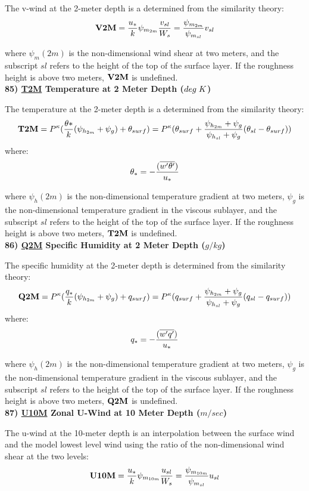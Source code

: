 \noindent
The v-wind at the 2-meter depth is a determined from the similarity theory:
\[
{\bf V2M} = {u_* \over k} \psi_{m_{2m}} {v_{sl} \over {W_s}} =
{ \psi_{m_{2m}} \over {\psi_{m_{sl}} }}v_{sl}
\]

\noindent
where $\psi_m(2m)$ is the non-dimensional wind shear at two meters, and the subscript
$sl$ refers to the height of the top of the surface layer. If the roughness height
is above two meters, ${\bf V2M}$ is undefined.
\\
 
\noindent
{\bf 85)  \underline {T2M}  Temperature at 2 Meter Depth ($deg \hspace{.1cm} K$) }

\noindent
The temperature at the 2-meter depth is a determined from the similarity theory:
\[
{\bf T2M} = P^{\kappa} ({\theta* \over k} ({\psi_{h_{2m}}+\psi_g}) + \theta_{surf} ) = 
P^{\kappa}(\theta_{surf} + { {\psi_{h_{2m}}+\psi_g} \over {{\psi_{h_{sl}}+\psi_g}} }
(\theta_{sl} - \theta_{surf})) 
\]
where:
\[
\theta_* = - { (\overline{w^{\prime}\theta^{\prime}}) \over {u_*} }
\]

\noindent
where $\psi_h(2m)$ is the non-dimensional temperature gradient at two meters, $\psi_g$ is
the non-dimensional temperature gradient in the viscous sublayer, and the subscript
$sl$ refers to the height of the top of the surface layer. If the roughness height
is above two meters, ${\bf T2M}$ is undefined.
\\
 
\noindent
{\bf 86)  \underline {Q2M}  Specific Humidity at 2 Meter Depth ($g/kg$) }

\noindent
The specific humidity at the 2-meter depth is determined from the similarity theory:
\[
{\bf Q2M} = P^{\kappa} ({q_* \over k} ({\psi_{h_{2m}}+\psi_g}) + q_{surf} ) = 
P^{\kappa}(q_{surf} + { {\psi_{h_{2m}}+\psi_g} \over {{\psi_{h_{sl}}+\psi_g}} }
(q_{sl} - q_{surf})) 
\]
where:
\[
q_* = - { (\overline{w^{\prime}q^{\prime}}) \over {u_*} }
\]

\noindent
where $\psi_h(2m)$ is the non-dimensional temperature gradient at two meters, $\psi_g$ is
the non-dimensional temperature gradient in the viscous sublayer, and the subscript
$sl$ refers to the height of the top of the surface layer. If the roughness height
is above two meters, ${\bf Q2M}$ is undefined.
\\
 
\noindent
{\bf 87)  \underline {U10M}  Zonal U-Wind at 10 Meter Depth ($m/sec$) }

\noindent
The u-wind at the 10-meter depth is an interpolation between the surface wind
and the model lowest level wind using the ratio of the non-dimensional wind shear
at the two levels:
\[
{\bf U10M} = {u_* \over k} \psi_{m_{10m}} {u_{sl} \over {W_s}} =
{ \psi_{m_{10m}} \over {\psi_{m_{sl}} }}u_{sl}
\]

